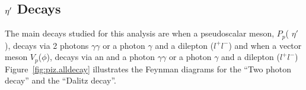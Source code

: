 \subsection{$\eta^{\prime}$ Decays}\label{sec:decays}
The main decays studied for this analysis are when a pseudoscalar meson, $P_p$( $\eta'$), decays via 2 photons $\gamma \gamma$ or a photon $\gamma$ and a dilepton ($l^{+}l^{-}$) and when a vector meson $V_p$($\phi$), decays via an \etaT and a photon $\gamma \gamma$ or a photon $\gamma$ and a dilepton ($l^{+}l^{-}$)  Figure~\ref{fig:piz.alldecay} illustrates the Feynman diagrams for the ``Two photon decay'' and the ``Dalitz decay''.
%

%
%